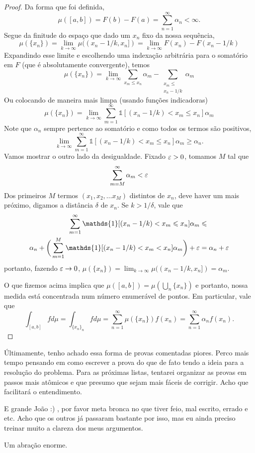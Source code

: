 \begin{proof}
    Da forma que foi definida,
    $$\mu([a,b]) = F(b) - F(a) = \sum_{n=1}^{\infty} \alpha_n < \infty.$$
    Segue da finitude do espaço que dado um $x_n$ fixo da nossa sequência,
    $$\mu(\{x_n\}) = \lim_{k \to \infty} \mu((x_n - 1/k, x_n]) = \lim_{k\to\infty} F(x_n) - F(x_n - 1/k)$$
    Expandindo esse limite e escolhendo uma indexação arbitrária para o somatório em $F$ (que é absolutamente convergente), temos 
    $$\mu(\{x_n\}) = \lim_{k \to \infty} \sum_{x_m \leq x_n} \alpha_m - \sum_{\substack{x_m \leq \\x_n - 1/k}}\alpha_m$$
    Ou colocando de maneira mais limpa (usando funções indicadoras)
    $$\mu(\{x_n\}) = \lim_{k\to \infty} \sum_{m=1}^{\infty} \mathds{1}[(x_n - 1/k) < x_m \leq x_n] \alpha_m$$
    Note que $\alpha_n$ sempre pertence ao somatório e como todos os termos são positivos,
    $$\lim_{k\to \infty} \sum_{m=1}^{\infty} \mathds{1}[(x_n - 1/k) < x_m \leq x_n] \alpha_m \geq \alpha_n.$$
    Vamos mostrar o outro lado da desigualdade. Fixado $\varepsilon > 0$, tomamos $M$ tal que 
    $$\sum_{m = M}^{\infty} \alpha_m < \varepsilon$$
    Dos primeiros $M$ termos $(x_1, x_2, \dots x_M)$ distintos de $x_n$, deve haver um mais próximo,
    digamos a distância $\delta$ de $x_n$. Se $k > 1/\delta$, vale que 
    \begin{align*}
        \sum_{m=1}^{\infty} \mathds{1}[(x_n - 1/k) < x_m \leq x_n] \alpha_m &\leq \\
        \alpha_n + \bigg(\sum_{m=1}^{M} \mathds{1}[(x_n - 1/k) < x_m < x_n] \alpha_m\bigg) + \eps &= \alpha_n + \eps
    \end{align*}
    portanto, fazendo $\varepsilon \rightarrow 0$, $\mu(\{x_n\}) = \lim_{k\to\infty} \mu((x_n - 1/k, x_n]) = \alpha_m$.

    O que fizemos acima implica que $\mu([a,b]) = \mu(\bigcup_n \{x_n\})$ e portanto, nossa medida está concentrada 
    num número enumerável de pontos. Em particular, vale que 
    $$\int_{[a,b]} f d\mu = \int_{\{x_n\}_n} f d\mu = \sum_{n=1}^{\infty} \mu(\{x_n\})f(x_n) = \sum_{n=1}^{\infty}\alpha_nf(x_n).$$

\end{proof}

\begin{observation}
    Últimamente, tenho achado essa forma de provas comentadas piores. Perco mais tempo pensando em como escrever a prova do que 
    de fato tendo a ideia para a resolução do problema. Para as próximas listas, tentarei organizar as provas em 
    passos mais atômicos e que presumo que sejam mais fáceis de corrigir. Acho que facilitará o entendimento.
    
    E grande João :) , por favor meta bronca no que tiver feio, mal escrito, errado e etc. Acho que os outros já passaram bastante por isso, mas eu 
    ainda preciso treinar muito a clareza dos meus argumentos.

    Um abração enorme.
\end{observation}

